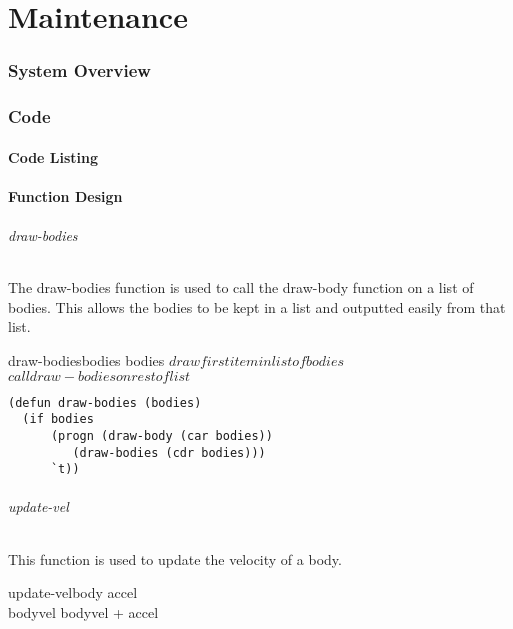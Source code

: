 \part{Maintenance}

\section{System Overview}

\section{Code}



\subsection{Code Listing}


\subsection{Function Design}

\paragraph{draw-bodies}
The draw-bodies function is used to call the draw-body function on a list of
bodies. This allows the bodies to be kept in a list and outputted easily from
that list.

\begin{pseudocode}{draw-bodies}{bodies}
	\IF bodies
	  \THEN 
	    \BEGIN
		$draw first item in list of bodies$ \\
		$call draw-bodies on rest of list$
	    \END
	  \ELSE
\end{pseudocode}

\begin{lstlisting}
(defun draw-bodies (bodies)
  (if bodies
      (progn (draw-body (car bodies))
	     (draw-bodies (cdr bodies)))
      `t)) 
\end{lstlisting}

\paragraph{update-vel}
This function is used to update the velocity of a body.

\begin{pseudocode}{update-vel}{body}
	\BEGIN
	accel \GETS {} \\
	bodyvel \GETS bodyvel + accel
	\END
\end{pseudocode}

